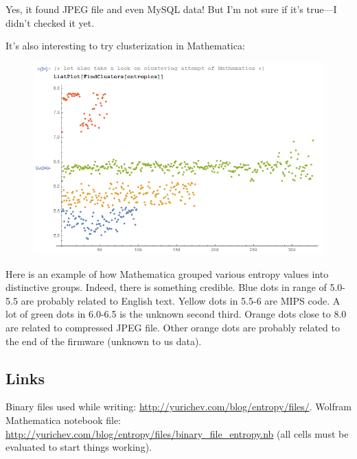 Yes, it found JPEG file and even MySQL data!
But I'm not sure if it's true---I didn't checked it yet.

It's also interesting to try clusterization in Mathematica:

\begin{figure}[H]
\centering
\includegraphics[scale=\FigScale]{ff/entropy/dashcam_clusters.png}
\end{figure}

Here is an example of how Mathematica grouped various entropy values into distinctive groups.
Indeed, there is something credible. Blue dots in range of 5.0-5.5 are probably related to English text.
Yellow dots in 5.5-6 are MIPS code. A lot of green dots in 6.0-6.5 is the unknown second third.
Orange dots close to 8.0 are related to compressed JPEG file.
Other orange dots are probably related to the end of the firmware (unknown to us data).

\subsection{Links}

Binary files used while writing: \url{http://yurichev.com/blog/entropy/files/}.
Wolfram Mathematica notebook file: \url{http://yurichev.com/blog/entropy/files/binary_file_entropy.nb}
(all cells must be evaluated to start things working).

